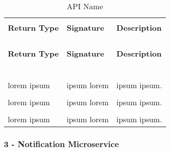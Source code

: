 \begin{longtable}{p{}p{}p{}}
    \caption{API Name}
    \vspace{0.5em}\\
    \hline
    \vspace{0.5em}\\
    \textbf{Return Type} & \textbf{Signature} & \textbf{Description} \\
    \vspace{0.5em}\\
    \hline
    \vspace{0.5em}\\
    \endfirsthead
    \vspace{0.5em}\\
    \hline
    \vspace{0.5em}\\
    \textbf{Return Type} & \textbf{Signature} & \textbf{Description} \\
    \vspace{0.5em}\\
    \hline
    \vspace{0.5em}\\
    \endhead
    
    \vspace{0.5em}\\
    \hline
    \vspace{0.5em}\\
    \endfoot
    
    \vspace{0.5em}\\
    \hline
    \vspace{0.5em}\\
    \endlastfoot
    
    lorem ipsum &
    ipsum lorem &
    ipsum ipsum. \\
    \vspace{0.5em}\\
    lorem ipsum &
    ipsum lorem &
    ipsum ipsum. \\
    \vspace{0.5em}\\
    lorem ipsum &
    ipsum lorem &
    ipsum ipsum. \\

\end{longtable}

\subsubsection{3 - Notification Microservice}

